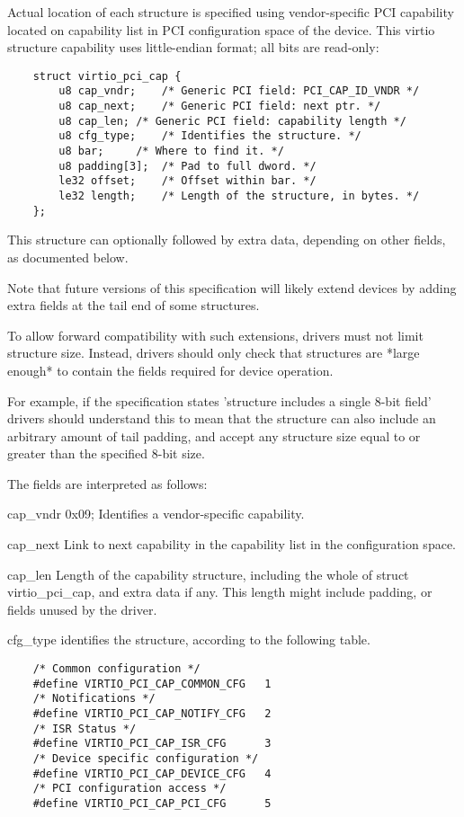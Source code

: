 Actual location of each structure is specified using vendor-specific PCI capability located
on capability list in PCI configuration space of the device.
This virtio structure capability uses little-endian format; all bits are
read-only:

\begin{lstlisting}
	struct virtio_pci_cap {
		u8 cap_vndr;	/* Generic PCI field: PCI_CAP_ID_VNDR */
		u8 cap_next;	/* Generic PCI field: next ptr. */
		u8 cap_len;	/* Generic PCI field: capability length */
		u8 cfg_type;	/* Identifies the structure. */
		u8 bar;		/* Where to find it. */
		u8 padding[3];	/* Pad to full dword. */
		le32 offset;	/* Offset within bar. */
		le32 length;	/* Length of the structure, in bytes. */
	};
\end{lstlisting}

This structure can optionally followed by extra data, depending on
other fields, as documented below.

Note that future versions of this specification will likely
extend devices by adding extra fields at the tail end of some structures.

To allow forward compatibility with such extensions, drivers must
not limit structure size.  Instead, drivers should only
check that structures are *large enough* to contain the fields
required for device operation.

For example, if the specification states 'structure includes a
single 8-bit field' drivers should understand this to mean that
the structure can also include an arbitrary amount of tail padding,
and accept any structure size equal to or greater than the
specified 8-bit size.

The fields are interpreted as follows:

cap_vndr
        0x09; Identifies a vendor-specific capability.

cap_next
        Link to next capability in the capability list in the configuration space.

cap_len
        Length of the capability structure, including the whole of
        struct virtio_pci_cap, and extra data if any.
        This length might include padding, or fields unused by the driver.

cfg_type
        identifies the structure, according to the following table.

\begin{lstlisting}
	/* Common configuration */
	#define VIRTIO_PCI_CAP_COMMON_CFG	1
	/* Notifications */
	#define VIRTIO_PCI_CAP_NOTIFY_CFG	2
	/* ISR Status */
	#define VIRTIO_PCI_CAP_ISR_CFG		3
	/* Device specific configuration */
	#define VIRTIO_PCI_CAP_DEVICE_CFG	4
	/* PCI configuration access */
	#define VIRTIO_PCI_CAP_PCI_CFG		5
\end{lstlisting}

